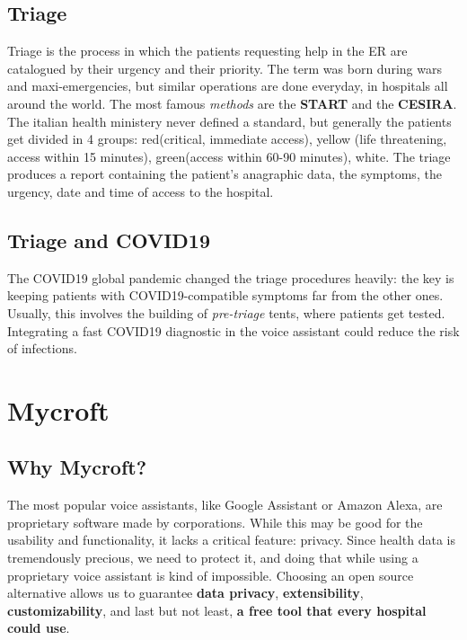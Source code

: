 \documentclass[conference]{IEEEtran}
\begin{document}
\subsection{Triage}
Triage is the process in which the patients requesting help in the ER are catalogued by their urgency and their priority. The term was born during wars and maxi-emergencies, but similar operations are done everyday, in hospitals all around the world. The most famous \textit{methods} are the \textbf{START} and the \textbf{CESIRA}. The italian health ministery never defined a standard, but generally the patients get divided in 4 groups: red(critical, immediate access), yellow (life threatening, access within 15 minutes), green(access within 60-90 minutes), white. The triage produces a report containing the patient's anagraphic data, the symptoms, the urgency, date and time of access to the hospital.
\subsection{Triage and COVID19}
\label{COVID}
The COVID19 global pandemic changed the triage procedures heavily: the key is keeping patients with COVID19-compatible symptoms far from the other ones. Usually, this involves the building of \textit{pre-triage} tents, where patients get tested. Integrating a fast COVID19 diagnostic in the voice assistant could reduce the risk of infections.
\section{Mycroft}
\label{sec:mycroft}
\subsection{Why Mycroft?}
The most popular voice assistants, like Google Assistant or Amazon Alexa, are proprietary software made by corporations. While this may be good for the usability and functionality, it lacks a critical feature: privacy. Since health data is tremendously precious, we need to protect it, and doing that while using a proprietary voice assistant is kind of impossible. Choosing an open source alternative allows us to guarantee \textbf{data privacy}, \textbf{extensibility}, \textbf{customizability}, and last but not least, \textbf{a free tool that every hospital could use}.
\end{document}
